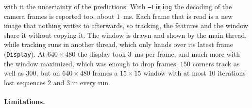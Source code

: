 \documentclass[11pt]{article}
\begin{document}
with it the uncertainty of the predictions. With \texttt{--timing} the decoding of the camera
frames is reported too, about $1$~ms. Each frame that is read is a new image that nothing writes to
afterwards, so tracking, the features and the window share it without copying it. The window is
drawn and shown by the main thread, while tracking runs in another thread, which only hands over
its latest frame (\texttt{Display}). At $640 \times 480$ the display took $3$~ms per frame, and much
more with the window maximized, which was enough to drop frames. $150$ corners track as well as
$300$, but on $640 \times 480$ frames a $15 \times 15$ window with at most $10$ iterations lost
sequences 2 and 3 in every run.

\paragraph{Limitations.}
\end{document}
